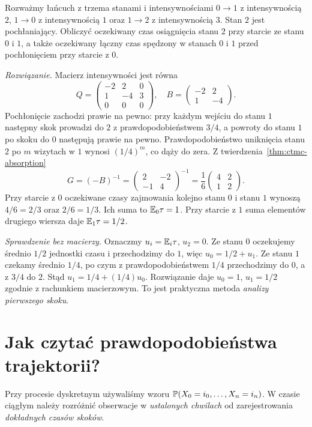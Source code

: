 \begin{zadanie}
Rozważmy łańcuch z trzema stanami i intensywnościami
$0\to1$ z intensywnością $2$, $1\to0$ z intensywnością $1$
oraz $1\to2$ z intensywnością $3$.
Stan $2$ jest pochłaniający. Obliczyć oczekiwany czas
osiągnięcia stanu $2$ przy starcie ze stanu $0$ i $1$,
a także oczekiwany łączny czas spędzony w stanach $0$ i $1$
przed pochłonięciem przy starcie z $0$.

\emph{Rozwiązanie.} Macierz intensywności jest równa
\[
Q=\begin{pmatrix}-2&2&0\\1&-4&3\\0&0&0\end{pmatrix},
\quad
B=\begin{pmatrix}-2&2\\1&-4\end{pmatrix}.
\]
Pochłonięcie zachodzi prawie na pewno: przy każdym wejściu
do stanu $1$ następny skok prowadzi do $2$ z
prawdopodobieństwem $3/4$, a powroty do stanu $1$ po skoku
do $0$ następują prawie na pewno. Prawdopodobieństwo
uniknięcia stanu $2$ po $m$ wizytach w $1$ wynosi $(1/4)^m$,
co dąży do zera.
Z twierdzenia~\ref{thm:ctmc-absorption}
\[
G=(-B)^{-1}
=\begin{pmatrix}2&-2\\-1&4\end{pmatrix}^{-1}
=\frac16\begin{pmatrix}4&2\\1&2\end{pmatrix}.
\]
Przy starcie z $0$ oczekiwane czasy zajmowania kolejno
stanu $0$ i stanu $1$ wynoszą $4/6=2/3$ oraz $2/6=1/3$.
Ich suma to $\mathbb{E}_0\tau=1$. Przy starcie z $1$ suma
elementów drugiego wiersza daje $\mathbb{E}_1\tau=1/2$.

\emph{Sprawdzenie bez macierzy.} Oznaczmy
$u_i=\mathbb{E}_i\tau$, $u_2=0$.
Ze stanu $0$ oczekujemy średnio $1/2$ jednostki czasu
i przechodzimy do $1$, więc $u_0=1/2+u_1$.
Ze stanu $1$ czekamy średnio $1/4$, po czym z
prawdopodobieństwem $1/4$ przechodzimy do $0$,
a z $3/4$ do $2$. Stąd
$u_1=1/4+(1/4)u_0$. Rozwiązanie daje
$u_0=1$, $u_1=1/2$ zgodnie z rachunkiem macierzowym.
To jest praktyczna metoda \emph{analizy pierwszego skoku}.
\end{zadanie}

\section{Jak czytać prawdopodobieństwa trajektorii?}
Przy procesie dyskretnym używaliśmy wzoru
$\mathbb{P}(X_0=i_0,\ldots,X_n=i_n)$.
W czasie ciągłym należy rozróżnić obserwacje
w \emph{ustalonych chwilach} od zarejestrowania
\emph{dokładnych czasów skoków}.

